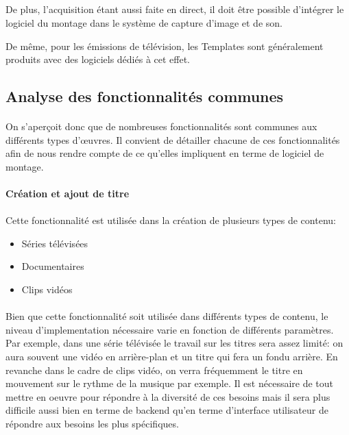 \subparagraph{}

De plus, l'acquisition étant aussi faite en direct, il doit être possible
d'intégrer le logiciel du montage dans le système de capture d'image
et de son.

De même, pour les émissions de télévision, les Templates sont
généralement produits avec des logiciels dédiés à cet effet.

\subsection{Analyse des fonctionnalités communes}

\paragraph{}

On s'aperçoit donc que de nombreuses fonctionnalités sont communes aux
différents types d'œuvres. Il convient de détailler chacune de ces
fonctionnalités afin de nous rendre compte de ce qu'elles impliquent
en terme de logiciel de montage.

\paragraph{Création et ajout de titre}

\paragraph{}

Cette fonctionnalité est utilisée dans la création de plusieurs types
de contenu:

\begin{itemize} \setlength{\itemsep}{2mm}

  \item {Séries télévisées}

  \item {Documentaires}

  \item {Clips vidéos}

\end{itemize}

\paragraph{}

Bien que cette fonctionnalité soit utilisée dans différents types de
contenu, le niveau d'implementation nécessaire varie en fonction de différents paramètres. Par
exemple, dans une série télévisée le travail sur les titres sera
assez limité: on aura souvent une vidéo en arrière-plan et un titre
qui fera un fondu arrière. En revanche dans le cadre de clips vidéo,
on verra fréquemment le titre en mouvement sur le rythme de la musique
par exemple. Il est nécessaire de tout mettre en oeuvre pour répondre
à la diversité de ces besoins mais il sera plus difficile aussi bien
en terme de backend qu'en terme d'interface utilisateur de répondre
aux besoins les plus spécifiques.

